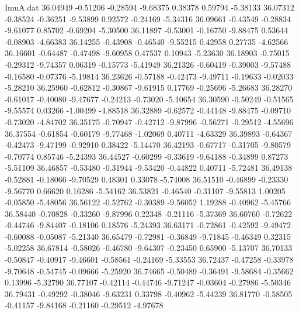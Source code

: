 \begin{filecontents}{ImuA.dat}
  36.04949   -0.51206   -0.28594   -9.68375    0.38378    0.59794   -5.38133
  36.07312   -0.38524   -0.36251   -9.53899    0.92572   -0.24169   -5.34316
  36.09661   -0.43549   -0.28834   -9.61077    0.85702   -0.69204   -5.30500
  36.11897   -0.53001   -0.16750   -9.88475    0.53644   -0.08903   -4.66383
  36.14255   -0.43908   -0.46540   -9.55215    0.42958    0.27735   -4.62566
  36.16601   -0.64487   -0.47498   -9.60958    0.47537    0.10943   -5.23630
  36.18903   -0.75015   -0.29312   -9.74357    0.06319   -0.15773   -5.41949
  36.21326   -0.60419   -0.39003   -9.57488   -0.16580   -0.07376   -5.19814
  36.23626   -0.57188   -0.42473   -9.49711   -0.19633   -0.02033   -5.28210
  36.25960   -0.62812   -0.30867   -9.61915    0.17769   -0.25696   -5.26683
  36.28270   -0.61017   -0.40080   -9.47677   -0.24213   -0.73020   -5.10654
  36.30590   -0.50249   -0.51565   -9.55574    0.03266   -1.00499   -4.88518
  36.32889   -0.62572   -0.44148   -9.88475   -0.09710   -0.73020   -4.84702
  36.35175   -0.70947   -0.42712   -9.87996   -0.56271   -0.29512   -4.55696
  36.37554   -0.61854   -0.60179   -9.77468   -1.02069    0.40711   -4.63329
  36.39893   -0.64367   -0.42473   -9.47199   -0.92910    0.38422   -5.14470
  36.42193   -0.67717   -0.31705   -9.80579   -0.70774    0.85746   -5.24393
  36.44527   -0.60299   -0.33619   -9.64188   -0.34899    0.87273   -5.51109
  36.46857   -0.53480   -0.31944   -9.53420   -0.44822    0.40711   -5.72481
  36.49138   -0.52881   -0.18066   -9.70529    0.48301    0.33078   -5.74008
  36.51510   -0.46899   -0.23330   -9.56770    0.66620    0.16286   -5.54162
  36.53821   -0.46540   -0.31107   -9.55813    1.00205   -0.05850   -5.48056
  36.56122   -0.52762   -0.30389   -9.56052    1.19288   -0.40962   -5.45766
  36.58440   -0.70828   -0.33260   -9.87996    0.22348   -0.21116   -5.37369
  36.60760   -0.72622   -0.44746   -9.84407   -0.18106    0.18576   -5.24393
  36.63171   -0.72861   -0.42592   -9.49472   -0.60088   -0.05087   -5.21340
  36.65479   -0.72981   -0.36849   -9.71845   -0.46349    0.32315   -5.02258
  36.67814   -0.58026   -0.46780   -9.64307   -0.23450    0.65900   -5.13707
  36.70133   -0.50847   -0.40917   -9.46601   -0.58561   -0.24169   -5.33553
  36.72437   -0.47258   -0.33978   -9.70648   -0.54745   -0.09666   -5.25920
  36.74665   -0.50489   -0.36491   -9.58684   -0.35662    0.13996   -5.32790
  36.77107   -0.42114   -0.44746   -9.71247   -0.03604   -0.27986   -5.50346
  36.79431   -0.49292   -0.38046   -9.63231    0.33798   -0.40962   -5.44239
  36.81770   -0.58505   -0.41157   -9.84168   -0.21160   -0.29512   -4.97678

\end{filecontents}
